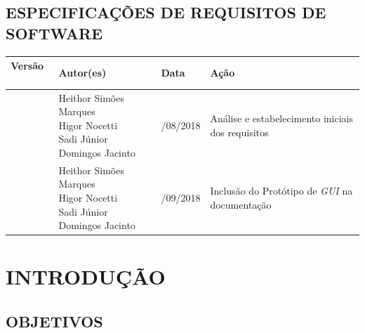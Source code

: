 \documentclass[12pt,a4paper,brazil,abntex2]{article}
\begin{document}
\newpage

\begin{center}

\section*{\normalsize ESPECIFICAÇÕES DE REQUISITOS DE SOFTWARE}
\thispagestyle{empty}
\end{center}

		\begin{table}[h]
			\begin{center}
			\begin{tabular}{|p{2cm}|p{4.5cm}|p{2cm}|p{4cm}|}
			\hline
				{\bf Versão} \	& {\bf Autor(es)}				& {\bf Data} 	& {\bf Ação}	\\\hline
				\parbox[c][\linewidth][c]{\linewidth}{} &
				\parbox[c][\linewidth][c]{\linewidth}{\centering Heithor Simões Marques\newline
								    							    Higor Nocetti\newline
								  							    Sadi Júnior Domingos Jacinto}&
				\parbox[c][\linewidth][c]{\linewidth}{/08/2018} &
				\parbox[c][\linewidth][c]{\linewidth}{\centering Análise e estabelecimento iniciais dos requisitos}\\\hline 
				
				\parbox[c][\linewidth][c]{\linewidth}{} &
				\parbox[c][\linewidth][c]{\linewidth}{\centering Heithor Simões Marques\newline
								    							    Higor Nocetti\newline
								  							    Sadi Júnior Domingos Jacinto}&
				\parbox[c][\linewidth][c]{\linewidth}{/09/2018} &
				\parbox[c][\linewidth][c]{\linewidth}{\centering Inclusão do Protótipo de \textit{GUI} na documentação}\\\hline 
			\end{tabular}
			\end{center}
		\end{table}
\newpage

\thispagestyle{empty}
\begin{center}
\tableofcontents
\end{center}

\newpage
\section{\normalsize INTRODUÇÃO}
	\subsection{\normalsize OBJETIVOS}
	
\end{document}

